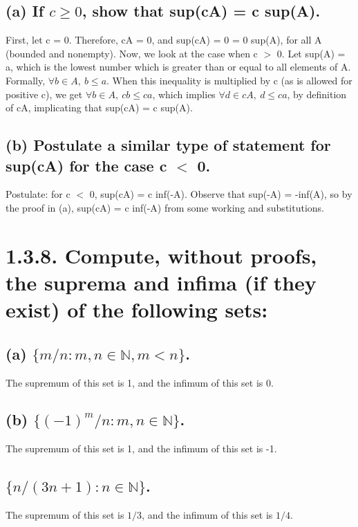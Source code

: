 \documentclass[12pt,letterpaper]{article}
\begin{document}
\subsection{(a) If \(c \geq 0\), show that sup(cA) = c sup(A).}

	First, let c = 0. Therefore, cA = {0}, and sup(cA) = 0 = 0 sup(A), for all A (bounded and nonempty). Now, we look at the case when c $>$ 0. Let sup(A) = a, which is the lowest number which is greater than or equal to all elements of A. Formally, \(\forall b \in A,\ b \leq a\). When this inequality is multiplied by c (as is allowed for positive c), we get \(\forall b \in A,\ cb \leq ca\), which implies \(\forall d \in cA,\ d \leq ca\), by definition of cA, implicating that sup(cA) = c sup(A).

\subsection{(b) Postulate a similar type of statement for sup(cA) for the case c \(<\) 0.}

	Postulate: for c \(<\) 0, sup(cA) = c inf(-A). Observe that sup(-A) = -inf(A), so by the proof in (a), sup(cA) = c inf(-A) from some working and substitutions.
	
\section{1.3.8. Compute, without proofs, the suprema and infima (if they exist) of the following sets:}
 
\subsection{(a) \(\{m/n : m, n \in \mathbb{N}, m < n\}\).}

	The supremum of this set is 1, and the infimum of this set is 0.
	
\subsection{(b) \(\{(-1)^{m}/n : m,n \in \mathbb{N}\}\).}

	The supremum of this set is 1, and the infimum of this set is -1.
	
\subsection{\(\{n/(3n+1) : n \in \mathbb{N}\}\).}

	The supremum of this set is \(1/3\), and the infimum of this set is \(1/4\).
	
\end{document}
